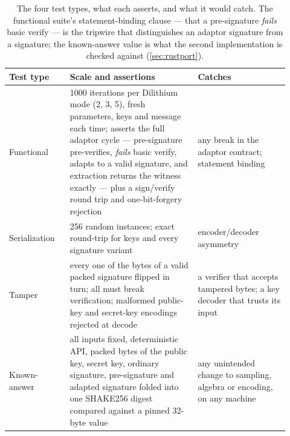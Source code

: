 \begin{table}[H]
  \centering
  \caption[The four test types]{The four test types, what each asserts, and what it
  would catch. The functional suite's statement-binding clause --- that a pre-signature
  \emph{fails} basic verify --- is the tripwire that distinguishes an adaptor signature
  from a signature; the known-answer value is what the second implementation is
  checked against (\cref{sec:rustport}).}
  \label{tab:tests}
  \small
  \begin{tabular}{@{}L{0.20\linewidth}L{0.42\linewidth}L{0.30\linewidth}@{}}
    \toprule
    Test type & Scale and assertions & Catches \\
    \midrule
    Functional
      & 1000 iterations per Dilithium mode (2, 3, 5), fresh parameters, keys and
        message each time; asserts the full adaptor cycle --- pre-signature
        pre-verifies, \emph{fails} basic verify, adapts to a valid signature, and
        extraction returns the witness exactly --- plus a sign/verify round trip and
        one-bit-forgery rejection
      & any break in the adaptor contract; statement binding \\[3pt]
    Serialization
      & 256 random instances; exact round-trip for keys and every signature variant
      & encoder/decoder asymmetry \\[3pt]
    Tamper
      & every one of the \tamperFlips{} bytes of a valid packed signature flipped in
        turn; all must break verification; malformed public-key and secret-key
        encodings rejected at decode
      & a verifier that accepts tampered bytes; a key decoder that trusts its input \\[3pt]
    Known-answer
      & all inputs fixed, deterministic API, packed bytes of the public key, secret key,
        ordinary signature, pre-signature and adapted signature folded into one SHAKE256
        digest compared against a pinned 32-byte value
      & any unintended change to sampling, algebra or encoding, on any machine \\
    \bottomrule
  \end{tabular}
\end{table}

